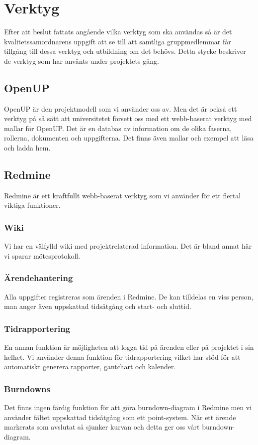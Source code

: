 \section{Verktyg}
Efter att beslut fattats angående vilka verktyg som ska användas så är det kvalitetssamordnarens uppgift att se till att samtliga gruppmedlemmar får tillgång till dessa verktyg och utbildning om det behövs. Detta stycke beskriver de verktyg som har använts under projektets gång.

\subsection{OpenUP}
OpenUP är den projektmodell som vi använder oss av. Men det är också ett verktyg på så sätt att universitetet försett oss med ett webb-baserat verktyg med mallar för OpenUP. Det är en databas av information om de olika faserna, rollerna, dokumenten och uppgifterna. Det finns även mallar och exempel att läsa och ladda hem.

\subsection{Redmine}
Redmine är ett kraftfullt webb-baserat verktyg som vi använder för ett flertal viktiga funktioner.

\subsubsection{Wiki}
Vi har en välfylld wiki med projektrelaterad information. Det är bland annat här vi sparar mötesprotokoll.

\subsubsection{Ärendehantering}
Alla uppgifter registreras som ärenden i Redmine. De kan tilldelas en viss person, man anger även uppskattad tidsåtgång och start- och sluttid.

\subsubsection{Tidrapportering}
En annan funktion är möjligheten att logga tid på ärenden eller på projektet i sin helhet. Vi använder denna funktion för tidrapportering vilket har stöd för att automatiskt generera rapporter, gantchart och kalender.

\subsubsection{Burndowns}
Det finns ingen färdig funktion för att göra burndown-diagram i Redmine men vi använder fältet uppskattad tidsåtgång som ett point-system. När ett ärende markerats som avslutat så sjunker kurvan och detta ger oss vårt burndown-diagram.

